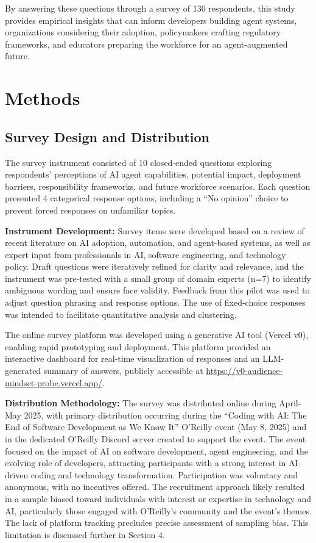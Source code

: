 \documentclass{article}
\begin{document}
By answering these questions through a survey of 130 respondents, this
study provides empirical insights that can inform developers building
agent systems, organizations considering their adoption, policymakers
crafting regulatory frameworks, and educators preparing the workforce
for an agent-augmented future.

\section{Methods}\label{methods}

\subsection{Survey Design and Distribution}\label{survey-design-and-distribution}

The survey instrument consisted of 10 closed-ended questions exploring
respondents' perceptions of AI agent capabilities, potential impact,
deployment barriers, responsibility frameworks, and future workforce
scenarios. Each question presented 4 categorical response options,
including a ``No opinion'' choice to prevent forced responses on
unfamiliar topics.

\textbf{Instrument Development:} Survey items were developed based on a
review of recent literature on AI adoption, automation, and agent-based
systems, as well as expert input from professionals in AI, software
engineering, and technology policy. Draft questions were iteratively
refined for clarity and relevance, and the instrument was pre-tested
with a small group of domain experts (n=7) to identify ambiguous wording
and ensure face validity. Feedback from this pilot was used to adjust
question phrasing and response options. The use of fixed-choice
responses was intended to facilitate quantitative analysis and
clustering.

The online survey platform was developed using a generative AI tool (Vercel v0), enabling rapid prototyping and deployment. This platform provided an interactive dashboard for real-time visualization of responses and an LLM-generated summary of answers, publicly accessible at \url{https://v0-audience-mindset-probe.vercel.app/}.

\textbf{Distribution Methodology:} The survey was distributed online
during April-May 2025, with primary distribution occurring during the
``Coding with AI: The End of Software Development as We Know It''
O'Reilly event (May 8, 2025) and in the dedicated O'Reilly Discord
server created to support the event. The event focused on the impact of
AI on software development, agent engineering, and the evolving role of
developers, attracting participants with a strong interest in AI-driven
coding and technology transformation. Participation was voluntary and anonymous, with no
incentives offered. The recruitment approach likely resulted in a sample
biased toward individuals with interest or expertise in technology and
AI, particularly those engaged with O'Reilly's community and the event's
themes. The lack of platform tracking precludes precise assessment of
sampling bias. This limitation is discussed further in Section 4.
\end{document}
